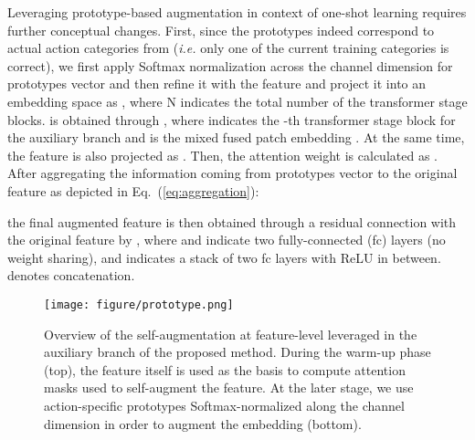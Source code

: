 \documentclass[lettersize,journal]{IEEEtran}
\begin{document}
Leveraging prototype-based augmentation in context of one-shot learning requires further conceptual changes. 
First, since the prototypes indeed correspond to actual action categories from  (\textit{i.e.} only one of the current training categories is correct), we first apply Softmax normalization across the channel dimension for prototypes vector  and then refine it with the feature  and project it into an embedding space as , where N indicates the total number of the transformer stage blocks.  is obtained through , where  indicates the -th transformer stage block for the auxiliary branch and  is the mixed fused patch embedding .
At the same time, the feature  is also projected as . Then, the attention weight  is calculated as . After aggregating the information coming from prototypes vector  to the original feature  as depicted in Eq.~(\ref{eq:aggregation}): 

the final augmented feature  is then obtained through a residual connection with the original feature  by , where  and  indicate two fully-connected (fc) layers (no weight sharing), and  indicates a stack of two fc layers with ReLU in between.  denotes concatenation. 
\begin{figure}[t]
\begin{center}
\texttt{[image: figure/prototype.png]}
\end{center}
\caption{Overview of the self-augmentation at feature-level leveraged in the auxiliary branch of the proposed method. During the warm-up phase (top), the feature itself is used as the basis to compute attention masks used to self-augment the feature. At the later stage, we use action-specific prototypes Softmax-normalized along the channel dimension in order to augment the embedding (bottom). 
}
\label{fig:augmentation}
\end{figure}
\end{document}
